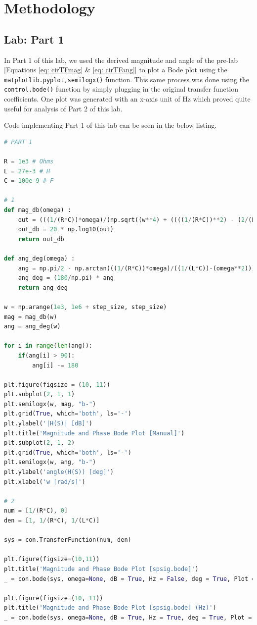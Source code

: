 \documentclass[12pt]{report}
\begin{document}
\section{Methodology}
\subsection{Lab: Part 1}\label{Section: Part1}
In Part 1 of this lab, we used the derived magnitude and angle of the pre-lab [Equations \eqref{eq: cirTFmag} \& \eqref{eq: cirTFang}] to plot a 
Bode plot using the \texttt{matplotlib.pyplot,semilogx()} function. This same process was done using the \texttt{control.bode()} function by simply
plugging in the original transfer function coefficients. One plot was generated with an x-axis unit of Hz which proved quite useful for analysis of
Part 2 of this lab.

Code implementing Part 1 of this lab can be seen in the below listing.

\begin{lstlisting}[language=Python, basicstyle=\footnotesize]
# PART 1

R = 1e3 # Ohms
L = 27e-3 # H
C = 100e-9 # F

# 1
def mag_db(omega) :
    out = (((1/(R*C))*omega)/(np.sqrt((w**4) + ((((1/(R*C))**2) - (2/(L*C))) * (omega**2)) + ((1/(L*C))**2))))
    out_db = 20 * np.log10(out)
    return out_db

def ang_deg(omega) :
    ang = np.pi/2 - np.arctan(((1/(R*C))*omega)/((1/(L*C))-(omega**2)))
    ang_deg = (180/np.pi) * ang
    return ang_deg

w = np.arange(1e3, 1e6 + step_size, step_size)
mag = mag_db(w)
ang = ang_deg(w)

for i in range(len(ang)):
    if(ang[i] > 90):
        ang[i] -= 180

plt.figure(figsize = (10, 11))
plt.subplot(2, 1, 1)
plt.semilogx(w, mag, "b-")
plt.grid(True, which='both', ls='-')
plt.ylabel('|H(S)| [dB]')
plt.title('Magnitude and Phase Bode Plot [Manual]')
plt.subplot(2, 1, 2)
plt.grid(True, which='both', ls='-')
plt.semilogx(w, ang, "b-")
plt.ylabel('angle(H(S)) [deg]')
plt.xlabel('w [rad/s]')

# 2
num = [1/(R*C), 0]
den = [1, 1/(R*C), 1/(L*C)]

sys = con.TransferFunction(num, den)

plt.figure(figsize=(10,11))
plt.title('Magnitude and Phase Bode Plot [spsig.bode]')
_ = con.bode(sys, omega=None, dB = True, Hz = False, deg = True, Plot = True)

plt.figure(figsize=(10, 11))
plt.title('Magnitude and Phase Bode Plot [spsig.bode] (Hz)')
_ = con.bode(sys, omega=None, dB = True, Hz = True, deg = True, Plot = True)
\end{lstlisting}
\end{document}
